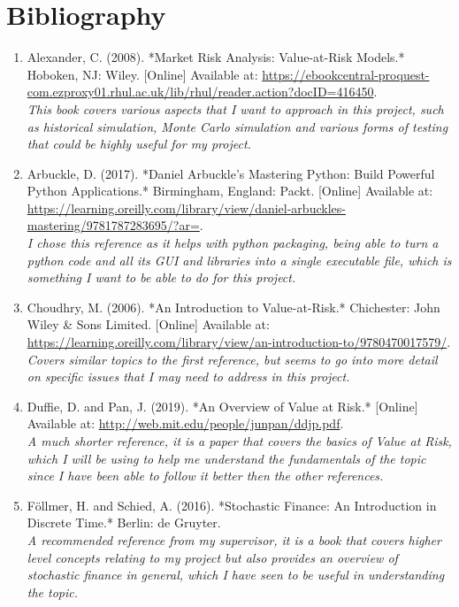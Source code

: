 \documentclass{article}
\begin{document}
\section{Bibliography}
\begin{enumerate}
  \item Alexander, C. (2008). *Market Risk Analysis: Value-at-Risk Models.* Hoboken, NJ: Wiley. [Online] Available at: \url{https://ebookcentral-proquest-com.ezproxy01.rhul.ac.uk/lib/rhul/reader.action?docID=416450}.
  \\\textit{This book covers various aspects that I want to approach in this project, such as historical simulation, Monte Carlo simulation and various forms of testing that could be highly useful for my project.}
  
  \item Arbuckle, D. (2017). *Daniel Arbuckle’s Mastering Python: Build Powerful Python Applications.* Birmingham, England: Packt. [Online] Available at: \url{https://learning.oreilly.com/library/view/daniel-arbuckles-mastering/9781787283695/?ar=}.
  \\\textit{I chose this reference as it helps with python packaging, being able to turn a python code and all its GUI and libraries into a single executable file, which is something I want to be able to do for this project.}

  \item Choudhry, M. (2006). *An Introduction to Value-at-Risk.* Chichester: John Wiley \& Sons Limited. [Online] Available at: \\ \url{https://learning.oreilly.com/library/view/an-introduction-to/9780470017579/}.
  \\\textit{Covers similar topics to the first reference, but seems to go into more detail on specific issues that I may need to address in this project.}
  
  \item Duffie, D. and Pan, J. (2019). *An Overview of Value at Risk.* [Online] Available at: \url{http://web.mit.edu/people/junpan/ddjp.pdf}.
  \\\textit{A much shorter reference, it is a paper that covers the basics of Value at Risk, which I will be using to help me understand the fundamentals of the topic since I have been able to follow it better then the other references.}
  
  \item Föllmer, H. and Schied, A. (2016). *Stochastic Finance: An Introduction in Discrete Time.* Berlin: de Gruyter.
  \\\textit{A recommended reference from my supervisor, it is a book that covers higher level concepts relating to my project but also provides an overview of stochastic finance in general, which I have seen to be useful in understanding the topic.}
  

\end{enumerate}
\end{document}
